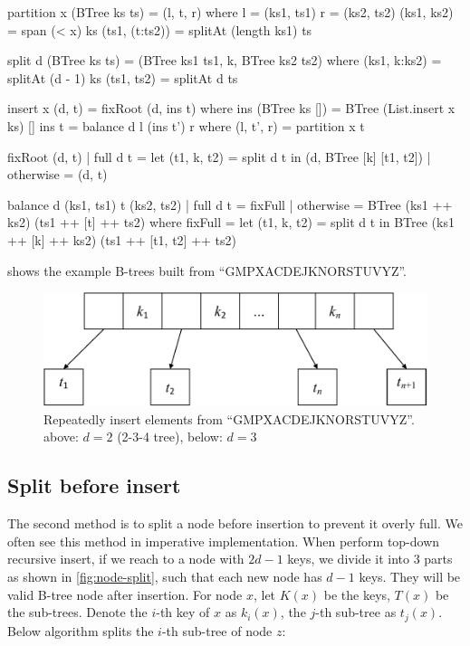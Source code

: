 \documentclass[b5paper]{article}
\begin{document}
\begin{Haskell}
partition x (BTree ks ts) = (l, t, r) where
  l = (ks1, ts1)
  r = (ks2, ts2)
  (ks1, ks2) = span (< x) ks
  (ts1, (t:ts2)) = splitAt (length ks1) ts

split d (BTree ks ts) = (BTree ks1 ts1, k, BTree ks2 ts2) where
  (ks1, k:ks2) = splitAt (d - 1) ks
  (ts1, ts2) = splitAt d ts

insert x (d, t) = fixRoot (d, ins t) where
    ins (BTree ks []) = BTree (List.insert x ks) []
    ins t = balance d l (ins t') r where (l, t', r) = partition x t

fixRoot (d, t) | full d t  = let (t1, k, t2) = split d t in
                               (d, BTree [k] [t1, t2])
               | otherwise = (d, t)

balance d (ks1, ts1) t (ks2, ts2)
    | full d t  = fixFull
    | otherwise = BTree (ks1 ++ ks2) (ts1 ++ [t] ++ ts2)
  where
    fixFull = let (t1, k, t2) = split d t in
                BTree (ks1 ++ [k] ++ ks2) (ts1 ++ [t1, t2] ++ ts2)
\end{Haskell}

 shows the example B-trees built from ``GMPXACDEJKNORSTUVYZ''.

\begin{figure}[htbp]
  \centering
  \includegraphics[scale=0.4, page=4]{img/btrees}
  \caption{Repeatedly insert elements from ``GMPXACDEJKNORSTUVYZ''. above: $d = 2$ (2-3-4 tree), below: $d = 3$}
  \label{fig:btree-insert-fp}
\end{figure}

\subsection{Split before insert}

The second method is to split a node before insertion to prevent it overly full. We often see this method in imperative implementation. When perform top-down recursive insert, if we reach to a node with $2d - 1$ keys, we divide it into 3 parts as shown in \cref{fig:node-split}, such that each new node has $d - 1$ keys. They will be valid B-tree node after insertion. For node $x$, let $K(x)$ be the keys, $T(x)$ be the sub-trees. Denote the $i$-th key of $x$ as $k_i(x)$, the $j$-th sub-tree as $t_j(x)$. Below algorithm splits the $i$-th sub-tree of node $z$:
\end{document}
